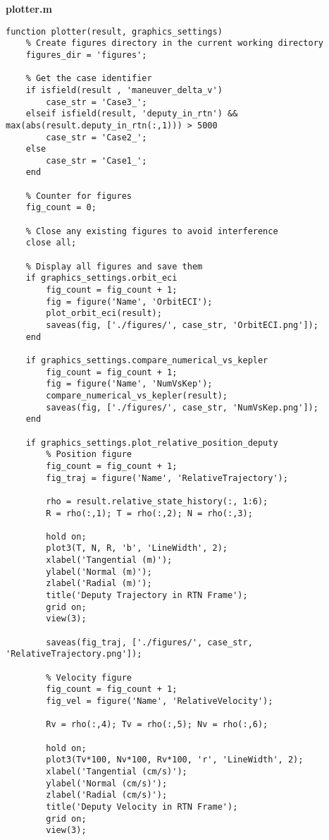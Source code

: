 \textbf{plotter.m}
\begin{lstlisting}
function plotter(result, graphics_settings)
    % Create figures directory in the current working directory
    figures_dir = 'figures';
    
    % Get the case identifier
    if isfield(result , 'maneuver_delta_v')
        case_str = 'Case3_';
    elseif isfield(result, 'deputy_in_rtn') && max(abs(result.deputy_in_rtn(:,1))) > 5000
        case_str = 'Case2_';
    else
        case_str = 'Case1_';
    end
    
    % Counter for figures
    fig_count = 0;
    
    % Close any existing figures to avoid interference
    close all;
    
    % Display all figures and save them
    if graphics_settings.orbit_eci
        fig_count = fig_count + 1;
        fig = figure('Name', 'OrbitECI');
        plot_orbit_eci(result);
        saveas(fig, ['./figures/', case_str, 'OrbitECI.png']);
    end

    if graphics_settings.compare_numerical_vs_kepler
        fig_count = fig_count + 1;
        fig = figure('Name', 'NumVsKep');
        compare_numerical_vs_kepler(result);
        saveas(fig, ['./figures/', case_str, 'NumVsKep.png']);
    end

    if graphics_settings.plot_relative_position_deputy
        % Position figure
        fig_count = fig_count + 1;
        fig_traj = figure('Name', 'RelativeTrajectory');
        
        rho = result.relative_state_history(:, 1:6);
        R = rho(:,1); T = rho(:,2); N = rho(:,3);
        
        hold on;
        plot3(T, N, R, 'b', 'LineWidth', 2);
        xlabel('Tangential (m)');
        ylabel('Normal (m)');
        zlabel('Radial (m)');
        title('Deputy Trajectory in RTN Frame');
        grid on;
        view(3);
        
        saveas(fig_traj, ['./figures/', case_str, 'RelativeTrajectory.png']);
        
        % Velocity figure
        fig_count = fig_count + 1;
        fig_vel = figure('Name', 'RelativeVelocity');
        
        Rv = rho(:,4); Tv = rho(:,5); Nv = rho(:,6);
        
        hold on;
        plot3(Tv*100, Nv*100, Rv*100, 'r', 'LineWidth', 2);
        xlabel('Tangential (cm/s)');
        ylabel('Normal (cm/s)');
        zlabel('Radial (cm/s)');
        title('Deputy Velocity in RTN Frame');
        grid on;
        view(3);
        

\end{lstlisting}
